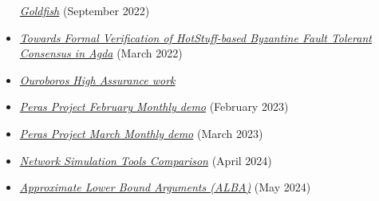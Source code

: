 \documentclass[10pt]{article}
\begin{document}
\begin{itemize}
  \href{https://arxiv.org/abs/2209.03255}{\color{blue}\textit{Goldfish}} (September 2022)
\item
  \href{https://arxiv.org/abs/2203.14711}{\color{blue}\textit{Towards Formal Verification of  HotStuff-based Byzantine Fault Tolerant Consensus in Agda}} (March
  2022)
\item
  \href{https://github.com/input-output-hk/ouroboros-high-assurance}{\color{blue}\textit{Ouroboros  High Assurance work}}
\item
  \href{https://docs.google.com/presentation/d/1xNgpC6ioIC4xM3Gn-LvFPZpw4onwAKNc-3EJY4GKEjs/edit\#slide=id.p}{\color{blue}\textit{Peras  Project February Monthly demo}} (February 2023)
\item
  \href{https://docs.google.com/presentation/d/1LZn1FhfbLH6rXtgxTvui1gz9yN0vT6NpmCrOdo2xnfo/edit\#slide=id.g124655d21b1_2_509}{\color{blue}\textit{Peras  Project March Monthly demo}} (March 2023)
\item
  \href{https://drive.google.com/file/d/1loxfRSv7q-TBM9f0Ch4Ap_SuBPOKk0uu/view?usp=sharing}{\color{blue}\textit{Network  Simulation Tools Comparison}} (April 2024)
\item
  \href{https://iohk.io/en/research/library/papers/approximate-lower-bound-arguments/}{\color{blue}\textit{Approximate  Lower Bound Arguments (ALBA)}} (May 2024)
\end{itemize}
\end{document}
